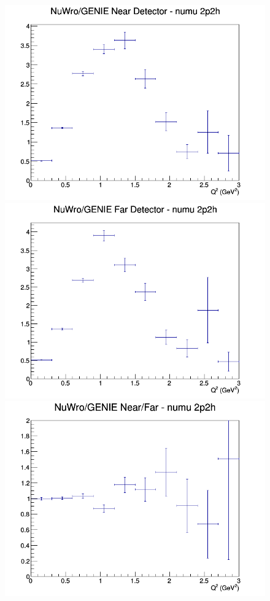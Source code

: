 \begin{figure}[h]
\endminipage
\newline
{}
\includegraphics[width=\linewidth]{Q2/nominal/ratios/2p2h_NuWro_GENIE_numu_near_Q2.png}
\endminipage
{}
\includegraphics[width=\linewidth]{Q2/nominal/ratios/2p2h_NuWro_GENIE_numu_far_Q2.png}
\endminipage
{}
\includegraphics[width=\linewidth]{Q2/nominal/ratios/2p2h_NuWro_GENIE_numu_NF_Q2.png}
\endminipage
\newline
\end{figure}
\clearpage
